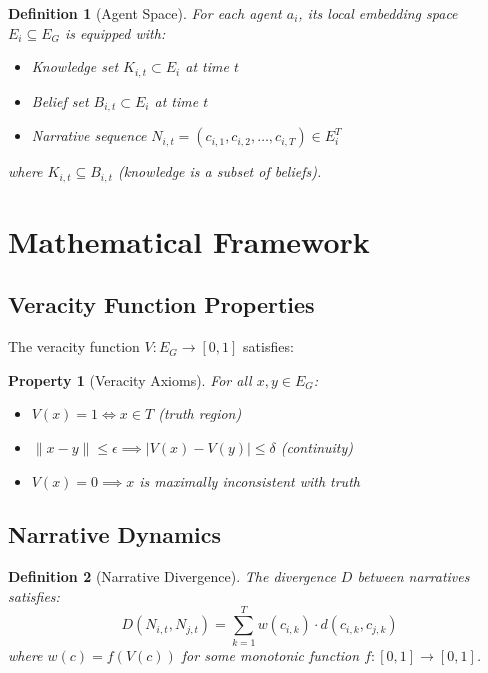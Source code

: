 \documentclass[12pt, a4paper]{article}
\newtheorem{definition}{Definition}
\newtheorem{property}{Property}
\begin{document}
\begin{definition}[Agent Space]
For each agent $a_i$, its local embedding space $E_i \subseteq E_G$ is equipped with:
\begin{itemize}
    \item Knowledge set $K_{i,t} \subset E_i$ at time $t$
    \item Belief set $B_{i,t} \subset E_i$ at time $t$
    \item Narrative sequence $N_{i,t} = (c_{i,1}, c_{i,2}, \dots, c_{i,T}) \in E_i^T$
\end{itemize}
where $K_{i,t} \subseteq B_{i,t}$ (knowledge is a subset of beliefs).
\end{definition}

\section{Mathematical Framework}

\subsection{Veracity Function Properties}
The veracity function $V: E_G \rightarrow [0,1]$ satisfies:

\begin{property}[Veracity Axioms]
For all $x,y \in E_G$:
\begin{itemize}
    \item $V(x) = 1 \iff x \in T$ (truth region)
    \item $\|x-y\| \leq \epsilon \implies |V(x) - V(y)| \leq \delta$ (continuity)
    \item $V(x) = 0 \implies x$ is maximally inconsistent with truth
\end{itemize}
\end{property}

\subsection{Narrative Dynamics}

\begin{definition}[Narrative Divergence]
The divergence $D$ between narratives satisfies:
\begin{equation}
    D(N_{i,t}, N_{j,t}) = \sum_{k=1}^T w(c_{i,k}) \cdot d(c_{i,k}, c_{j,k})
\end{equation}
where $w(c) = f(V(c))$ for some monotonic function $f:[0,1] \rightarrow [0,1]$.
\end{definition}
\end{document}
